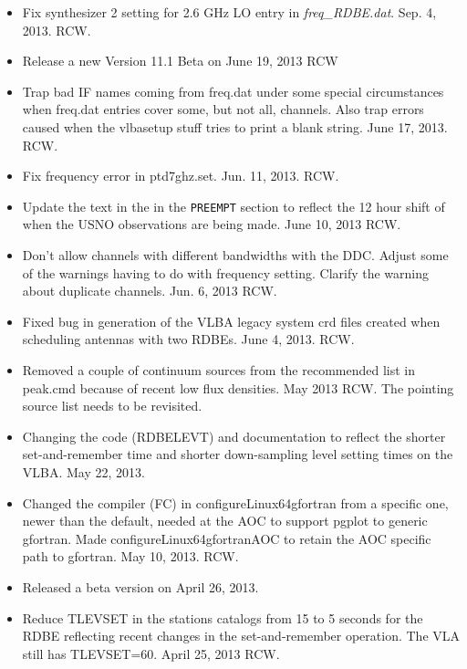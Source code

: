 \documentclass{report}
\begin{document}
\begin{itemize}
\item Fix synthesizer 2 setting for 2.6 GHz LO entry in
{\sl freq\_RDBE.dat}.  Sep. 4, 2013.  RCW.

\item Release a new Version 11.1 Beta on June 19, 2013  RCW

\item Trap bad IF names coming from freq.dat under some special
circumstances when freq.dat entries cover some, but not all, 
channels.  Also trap errors caused when the vlbasetup stuff tries
to print a blank string.  June 17, 2013.  RCW.

\item Fix frequency error in ptd7ghz.set.  Jun. 11, 2013.  RCW.

\item Update the text in the in the {\tt PREEMPT} section to reflect
the 12 hour shift of when the USNO observations are being made.
June 10, 2013  RCW.

\item Don't allow channels with different bandwidths with the DDC.
Adjust some of the warnings having to do with frequency setting.
Clarify the warning about duplicate channels.   Jun. 6, 2013  RCW.

\item Fixed bug in generation of the VLBA legacy system crd files 
created when scheduling antennas with two RDBEs.  June 4, 2013.  RCW.

\item Removed a couple of continuum sources from the recommended list
in peak.cmd because of recent low flux densities.  May 2013  RCW.
The pointing source list needs to be revisited.

\item Changing the code (RDBELEVT) and documentation to reflect the
shorter set-and-remember time and shorter down-sampling level setting
times on the VLBA.  May 22, 2013.

\item Changed the compiler (FC) in configureLinux64gfortran from a
specific one, newer than the default, needed at the AOC to support 
pgplot to generic gfortran.  Made configureLinux64gfortranAOC to 
retain the AOC specific path to gfortran.  May 10, 2013.  RCW.

\item Released a beta version on April 26, 2013.

\item Reduce TLEVSET in the stations catalogs from 15 to 5 seconds 
for the RDBE reflecting recent changes in the set-and-remember operation.
The VLA still has TLEVSET=60.  April 25, 2013  RCW.


\end{itemize}
\end{document}

